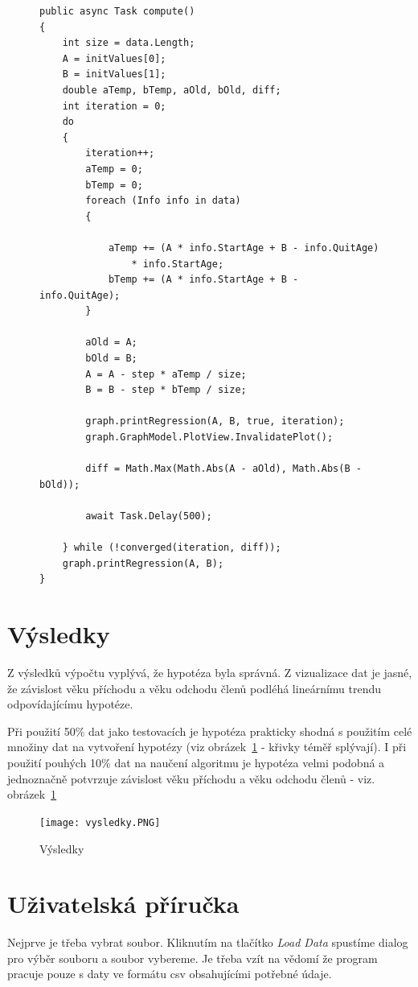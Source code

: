 \documentclass[a4paper,12pt]{article}
\begin{document}
\begin{figure}
\begin{lstlisting}[caption={Algoritmus gradientního sestupu},label=lst:descent]
public async Task compute()
{
	int size = data.Length;
	A = initValues[0];
	B = initValues[1];
	double aTemp, bTemp, aOld, bOld, diff;
	int iteration = 0;
	do
	{
    	iteration++;
		aTemp = 0;
		bTemp = 0;
		foreach (Info info in data)
		{
			   
			aTemp += (A * info.StartAge + B - info.QuitAge) 
				* info.StartAge;
			bTemp += (A * info.StartAge + B - info.QuitAge);
		}

        aOld = A;
        bOld = B;
		A = A - step * aTemp / size;
		B = B - step * bTemp / size;

		graph.printRegression(A, B, true, iteration);
		graph.GraphModel.PlotView.InvalidatePlot();

        diff = Math.Max(Math.Abs(A - aOld), Math.Abs(B - bOld));

		await Task.Delay(500);

    } while (!converged(iteration, diff));
    graph.printRegression(A, B);
}
\end{lstlisting} 
\end{figure}

\section{Výsledky}
Z výsledků výpočtu vyplývá, že hypotéza byla správná. Z vizualizace dat je jasné, že závislost věku příchodu a věku odchodu členů podléhá lineárnímu trendu odpovídajícímu hypotéze.

Při použití 50\% dat jako testovacích je hypotéza prakticky shodná s použitím celé množiny dat na vytvoření hypotézy (viz obrázek~\ref{fig:vysedky} - křivky téměř splývají). I při použití pouhých 10\% dat na naučení algoritmu je hypotéza velmi podobná a jednoznačně potvrzuje závislost věku příchodu a věku odchodu členů - viz. obrázek~\ref{fig:vysedky}

\begin{figure}[h!]
\centering
\texttt{[image: vysledky.PNG]}
\caption{Výsledky}
\label{fig:vysedky}
\end{figure}


\section{Uživatelská příručka}
Nejprve je třeba vybrat soubor. Kliknutím na tlačítko \emph{Load Data} spustíme dialog pro výběr souboru a soubor vybereme. Je třeba vzít na vědomí že program pracuje pouze s daty ve formátu csv obsahujícími potřebné údaje.
\end{document}
